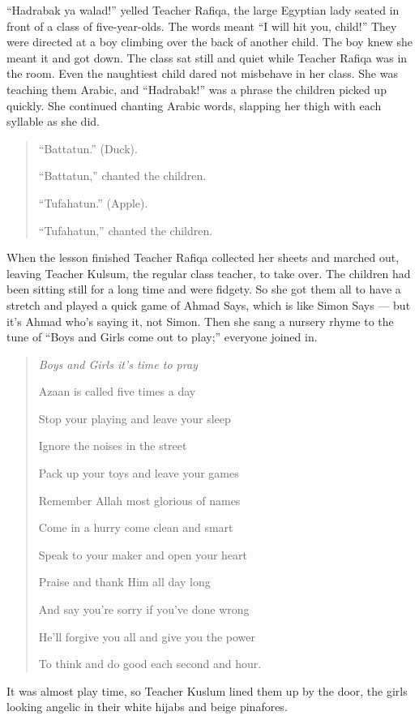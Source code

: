 \documentclass[12pt]{memoir}
\newcommand{\cor}[2]{#2} %
\begin{document}
“Hadrabak ya walad!” yelled Teacher Rafiqa,
the large Egyptian lady seated in front of a class of five-year-olds.
The words meant “I will hit you, child!”
They were directed at a boy climbing over the back of another child.
The boy knew she meant it and got down.
The class sat still and quiet while Teacher Rafiqa was in the room.
Even the naughtiest child dared not misbehave in her class.
She was teaching them Arabic, and “Hadrabak!” was a phrase
the children picked up quickly.
She continued chanting Arabic words,
slapping her thigh with each syllable as she did.

\begin{quote}
“Battatun.” (Duck).

“Battatun,” chanted the children.

“Tufahatun.” (Apple).

“Tufahatun,” chanted the children.
\end{quote}

When the lesson finished Teacher Rafiqa collected her sheets and marched out,
leaving Teacher Kulsum, the regular class teacher, to take over.
The children had been sitting still for a long time and were fidgety.
So she got them all to have a stretch and played a quick game of Ahmad Says,
which is like Simon Says — but it’s Ahmad who’s saying it, not Simon.
Then she sang a nursery rhyme to the tune of
“Boys and Girls come out to play;” everyone joined in.

\begin{quote}
\itshape
Boys and Girls \cor{its}{it’s} time to pray

Azaan is called five times a day

Stop your playing and leave your sleep

Ignore the noises in the street

Pack up your toys and leave your games

Remember Allah most glorious of names

Come in a hurry come clean and smart

Speak to your maker and open your heart

Praise and thank Him all day long

And say you’re sorry if you’ve done wrong

He’ll forgive you all and give you the power

To think and do good each second and hour.
\end{quote}

It was almost play time, so Teacher Kuslum lined them up by the door,
the girls looking angelic in their white hijabs and beige pinafores.
\end{document}
